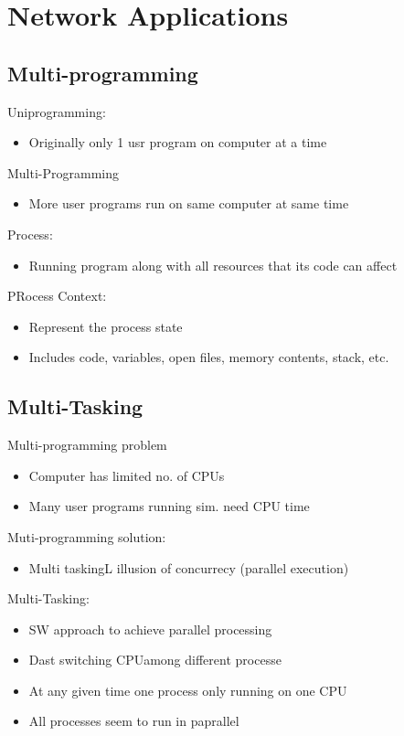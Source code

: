 \section{Network Applications}

\subsection{Multi-programming}

Uniprogramming:
\begin{itemize}
	\item Originally only 1 usr program on computer at a time
\end{itemize}

Multi-Programming
\begin{itemize}
	\item More user programs run on same computer at same time
\end{itemize}

Process:
\begin{itemize}
	\item Running program along with all resources that its code can affect
\end{itemize}

PRocess Context:
\begin{itemize}
	\item Represent the process state
	\item Includes code, variables, open files, memory contents, stack, etc.
\end{itemize}

\subsection{Multi-Tasking}

Multi-programming problem
\begin{itemize}
	\item Computer has limited no. of CPUs
	\item Many user programs running sim. need CPU time
\end{itemize}

Muti-programming solution:
\begin{itemize}
	\item Multi taskingL illusion of concurrecy (parallel execution)
\end{itemize}

Multi-Tasking:
\begin{itemize}
	\item SW approach to achieve parallel processing
	\item Dast switching CPUamong different processe
	\item At any given time one process only running on one CPU
	\item All processes seem to run in paprallel
\end{itemize}

